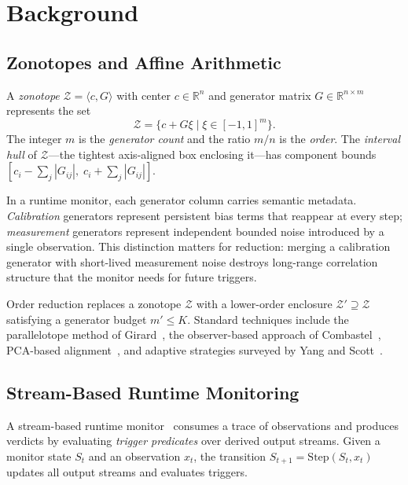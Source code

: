 \documentclass{article}
\newcommand{\Z}{\mathcal{Z}}
\newcommand{\reals}{\mathbb{R}}
\begin{document}
\section{Background}\label{sec:background}

\subsection{Zonotopes and Affine Arithmetic}\label{sec:bg-zonotopes}

A \emph{zonotope} $\Z = \langle c, G \rangle$ with center $c \in \reals^n$ and generator matrix $G \in \reals^{n \times m}$ represents the set
\begin{equation}\label{eq:zonotope}
\Z = \bigl\{ c + G\xi \;\big|\; \xi \in [-1,1]^m \bigr\}.
\end{equation}
The integer $m$ is the \emph{generator count} and the ratio $m/n$ is the \emph{order}.
The \emph{interval hull} of $\Z$---the tightest axis-aligned box enclosing it---has component bounds $[c_i - \sum_j |G_{ij}|,\; c_i + \sum_j |G_{ij}|]$.

In a runtime monitor, each generator column carries semantic metadata.
\emph{Calibration} generators represent persistent bias terms that reappear at every step; \emph{measurement} generators represent independent bounded noise introduced by a single observation.
This distinction matters for reduction: merging a calibration generator with short-lived measurement noise destroys long-range correlation structure that the monitor needs for future triggers.

Order reduction replaces a zonotope $\Z$ with a lower-order enclosure $\Z' \supseteq \Z$ satisfying a generator budget $m' \leq K$.
Standard techniques include the parallelotope method of Girard~\cite{Girard2005}, the observer-based approach of Combastel~\cite{Combastel2003}, PCA-based alignment~\cite{Kopetzki2017}, and adaptive strategies surveyed by Yang and Scott~\cite{YangScott2018}.

\subsection{Stream-Based Runtime Monitoring}\label{sec:bg-monitoring}

A stream-based runtime monitor~\cite{RTLola2026} consumes a trace of observations and produces verdicts by evaluating \emph{trigger predicates} over derived output streams.
Given a monitor state $S_t$ and an observation $x_t$, the transition $S_{t+1} = \mathrm{Step}(S_t, x_t)$ updates all output streams and evaluates triggers.
\end{document}
